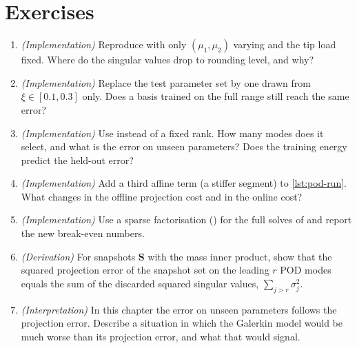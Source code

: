 \section*{Exercises}\label{sec:pod-exercises}
\begin{enumerate}
\item \emph{(Implementation)} Reproduce  with only $(\mu_1,\mu_2)$ varying and the tip load fixed. Where do the singular values drop to rounding level, and why?
\item \emph{(Implementation)} Replace the test parameter set by one drawn from $\xi\in[0.1,0.3]$ only. Does a basis trained on the full range still reach the same error?
\item \emph{(Implementation)} Use  instead of a fixed rank. How many modes does it select, and what is the error on unseen parameters? Does the training energy predict the held-out error?
\item \emph{(Implementation)} Add a third affine term (a stiffer segment) to \cref{lst:pod-run}. What changes in the offline projection cost and in the online cost?
\item \emph{(Implementation)} Use a sparse factorisation () for the full solves of  and report the new break-even numbers.
\item \emph{(Derivation)} For snapshots $\bm S$ with the mass inner product, show that the squared projection error of the snapshot set on the leading $r$ POD modes equals the sum of the discarded squared singular values, $\sum_{j>r}\sigma_j^2$.
\item \emph{(Interpretation)} In this chapter the error on unseen parameters follows the projection error. Describe a situation in which the Galerkin model would be much worse than its projection error, and what that would signal.
\end{enumerate}

\chapterrefs
